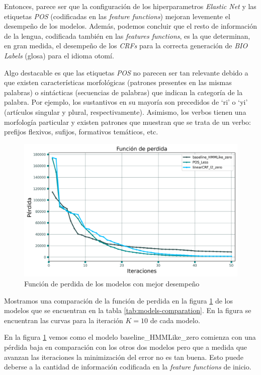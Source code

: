 \documentclass[letterpaper,12pt,oneside]{book}
\theoremstyle{definition}
\begin{document}
Entonces, parece ser que la configuración de los hiperparametros \textit{Elastic Net} y las etiquetas \textit{POS} (codificadas en las \textit{feature functions}) mejoran levemente el desempeño de los modelos. Además, podemos concluir que el resto de información de la lengua, codificada también en las \textit{features functions}, es la que determinan, en gran medida, el desempeño de los \textit{CRFs} para la correcta generación de \textit{BIO Labels} (glosa) para el idioma otomí.

Algo destacable es que las etiquetas \textit{POS} no parecen ser tan relevante debido a que existen características morfológicas (patrones presentes en las mismas palabras) o sintácticas (secuencias de palabras) que indican la categoría de la palabra. Por ejemplo, los sustantivos en su mayoría son precedidos de `ri' o `yi' (artículos singular y plural, respectivamente). Asimismo, los verbos tienen una morfología particular y existen patrones que muestran que se trata de un verbo: prefijos flexivos, sufijos, formativos temáticos, etc.

\begin{figure}[ht]
	\centering
	\includegraphics[width=\textwidth]{img/loss_models.png}
	\caption{Función de perdida de los modelos con mejor desempeño}
	\label{fig:loss_models}
\end{figure}

Mostramos una comparación de la función de perdida en la figura \ref{fig:loss_models} de los modelos que se encuentran en la tabla \ref{tab:models-comparation}. En la figura se encuentran las curvas para la iteración $K = 10$ de cada modelo.

En la figura \ref{fig:loss_models} vemos como el modelo \textsf{baseline\_HMMLike\_zero} comienza con una pérdida baja en comparación con los otros dos modelos pero que a medida que avanzan las iteraciones la minimización del error no es tan buena. Esto puede deberse a la cantidad de información codificada en la \textit{feature functions} de inicio.
\end{document}
